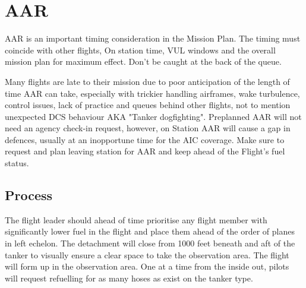 \section{AAR}

AAR is an important timing consideration in the Mission Plan. The timing must
coincide with other flights, On station time, VUL windows and the overall
mission plan for maximum effect. Don't be caught at the back of the queue.

Many flights are late to their mission due to poor anticipation of the length
of time AAR can take, especially with trickier handling airframes, wake
turbulence, control issues, lack of practice and queues behind other flights,
not to mention unexpected DCS behaviour AKA "Tanker dogfighting". Preplanned
AAR will not need an agency check-in request, however, on Station AAR will
cause a gap in defences, usually at an inopportune time for the AIC coverage.
Make sure to request and plan  leaving station for AAR and keep ahead of the
Flight's fuel status.

\subsection{Process}

The flight leader should ahead of time prioritise any flight member with
significantly lower fuel in the flight and place them ahead of the order of
planes in left echelon. The detachment will close from 1000 feet beneath and
aft of the tanker to visually ensure a clear space to take the observation
area. The flight will form up in the observation area. One at a time from the
inside out, pilots will request refuelling for as many hoses as exist on the
tanker type.

